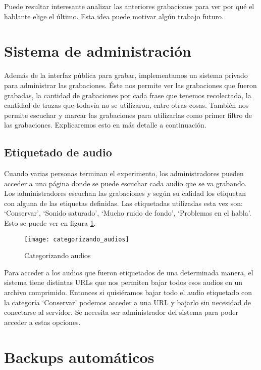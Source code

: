 Puede resultar interesante analizar las anteriores grabaciones para ver por qué el hablante elige el último. Esta idea puede motivar algún trabajo futuro.

\section{Sistema de administración}

Además de la interfaz pública para grabar, implementamos un sistema privado para administrar las grabaciones. Éste nos permite ver las grabaciones que fueron grabadas, la cantidad de grabaciones por cada frase que tenemos recolectada, la cantidad de trazas que todavía no se utilizaron, entre otras cosas. También nos permite escuchar y marcar las grabaciones para utilizarlas como primer filtro de las grabaciones. Explicaremos esto en más detalle a continuación.

\subsection{Etiquetado de audio}

Cuando varias personas terminan el experimento, los administradores pueden acceder a una página donde se puede escuchar cada audio que se va grabando. Los administradores escuchan las grabaciones y según su calidad los etiquetan con alguna de las etiquetas definidas. Las etiquetadas utilizadas esta vez son: `Conservar’,  `Sonido saturado’, `Mucho ruido de fondo’, `Problemas en el habla’. Esto se puede ver en figura \ref{cat}.

\begin{figure}[h!]
    \centerline{\texttt{[image: categorizando\_audios]} }
    \caption{Categorizando audios}
    \label{cat}
\end{figure}

Para acceder a los audios que fueron etiquetados de una determinada manera, el sistema tiene distintas URLs que nos permiten bajar todos esos audios en un archivo comprimido. Entonces si quisiéramos bajar todo el audio etiquetado con la categoría `Conservar’ podemos acceder a una URL y bajarlo sin necesidad de conectarse al servidor. Se necesita ser administrador del sistema para poder acceder a estas opciones.

\section{Backups automáticos}

